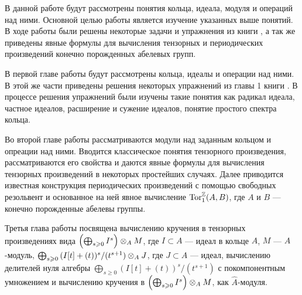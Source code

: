 В данной работе будут рассмотрены понятия кольца, идеала, модуля и операций над ними. 
Основной целью работы является изучение указанных выше понятий. 
В ходе работы были решены некоторые задачи и упражнения из книги \cite{A-M}, а так же приведены 
явные формулы для вычисления тензорных и периодических произведений конечно порожденных абелевых групп. 

В первой главе работы будут рассмотрены кольца, идеалы и операции над ними. В этой же части приведены решения некоторых упражнений из главы 1 книги \cite{A-M}. В процессе 
решения упражнений были изучены такие понятия как радикал идеала, частное идеалов, расширение и сужение идеалов, понятие простого спектра кольца.

Во второй главе работы рассматриваются модули над заданным кольцом и опреации над ними. 
Вводится классическое понятия тензорного произведения, рассматриваются его свойства и даются 
явные формулы для вычисления тензорных произведений в некоторых простейших случаях. 
Далее приводится известная конструкция периодических произведений с помощью свободных резольвент и основанное на ней явное вычисление $\textup{Tor}_1^{\mathbb{Z}}(A, B)$, где $A$ и $B$ --- конечно порожденные абелевы группы.

Третья глава работы посвящена вычислению кручения в тензорных произведениях вида
$\left(\bigoplus_{s \geqslant 0} I^s \right) \otimes_A M$, где $I \subset A$ --- идеал в кольце $A$, $M$ ---
$A$-модуль, $\bigoplus_{s \geqslant 0}{(I[t] + (t))^s / (t^{s + 1})} \otimes_A J$, где $J \subset A$ --- идеал,
вычислению делителей нуля алгебры $\bigoplus_{s \geq 0}{(I[t] + (t))^s / (t^{s + 1})}$ с покомпонентным
умножением и вычислению кручения в $\left(\bigoplus_{s \geqslant 0} I^s \right) \otimes_A M$, как $\hat A$-модуля.
